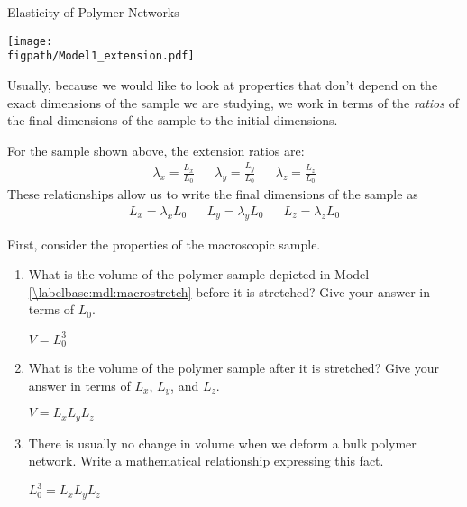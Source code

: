 \begin{activity}{Elasticity of Polymer Networks}
\begin{model}
	\vspace{6pt}
	\centerline{\texttt{[image: \\figpath/Model1\_extension.pdf]}}
	
	Usually, because we would like to look at properties that don't depend on the exact dimensions of the sample we are studying, we work in terms of the \emph{ratios} of the final dimensions of the sample to the initial dimensions.
	
	For the sample shown above, the extension ratios are:
	\begin{align*}
		\lambda_x = \frac{L_x}{L_0} && \lambda_y = \frac{L_y}{L_0} && \lambda_z = \frac{L_z}{L_0}
	\end{align*}
	These relationships allow us to write the final dimensions of the sample as
	\begin{align*}
		L_x = \lambda_x L_0 && L_y = \lambda_y L_0 && L_z = \lambda_z L_0
	\end{align*}
	
\end{model}


\begin{ctqs}

	\question First, consider the properties of the macroscopic sample.
	
		\begin{enumerate}
		
			\item What is the volume of the polymer sample depicted in Model \ref{\labelbase:mdl:macrostretch} before it is stretched?  Give your answer in terms of $L_0$.
	
		\begin{solution}[0.5in]
		
			$V = L_0^3$
		\end{solution}
	
			\item What is the volume of the polymer sample after it is stretched? Give your answer in terms of $L_x$, $L_y$, and $L_z$.
	
		\begin{solution}[0.5in]
		
			$V = L_x L_y L_z$
		\end{solution}
	
			\item There is usually no change in volume when we deform a bulk polymer network.  Write a mathematical relationship expressing this fact.
		\label{\labelbase:ctq:equalvolumes}
	
		\begin{solution}[0.5in]
			$L_0^3 = L_x L_y L_z$
		\end{solution}
		

\end{enumerate}
\end{ctqs}
\end{activity}
